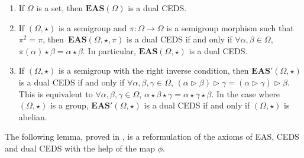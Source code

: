 \documentclass[pdftex]{sigma}
\numberwithin{equation}{section}
\newcommand{\eas}{\mathbf{EAS}}
\begin{document}
\begin{Example}\qquad
\begin{enumerate}\itemsep=0pt
 \item[(1)] If $\Omega$ is a set, then $\eas(\Omega)$ is a dual CEDS.
 \item[(2)] If $(\Omega,\star)$ is a semigroup and $\pi\colon\Omega\longrightarrow \Omega$ is a semigroup morphism such that $\pi^2=\pi$, then~${\eas(\Omega,\star,\pi)}$ is a dual CEDS if and only if
$
 \forall \alpha,\beta \in \Omega$, $\pi(\alpha)\star \beta =\alpha \star \beta$.
 In particular, $\eas(\Omega,\star)$ is a dual CEDS.
 \item[(3)] If $(\Omega,\star)$ is a semigroup with the right inverse condition, then $\eas'(\Omega,\star)$ is a dual CEDS if and only if
$\forall \alpha,\beta,\gamma \in \Omega$, $(\alpha \triangleright \beta) \triangleright \gamma =(\alpha \triangleright \gamma) \triangleright \beta$.
 This is equivalent to
$\forall \alpha,\beta,\gamma \in \Omega$, $\alpha \star \beta \star \gamma =\alpha \star \gamma \star \beta$.
 In the case where $(\Omega,\star)$ is a group, $\eas'(\Omega,\star)$ is a dual CEDS if and only if $(\Omega,\star)$ is abelian.
 \end{enumerate}\end{Example}

The following lemma, proved in \cite{Foissy48}, is a reformulation of the axioms of EAS, CEDS and dual CEDS with the help of the map $\phi$.
\end{document}
